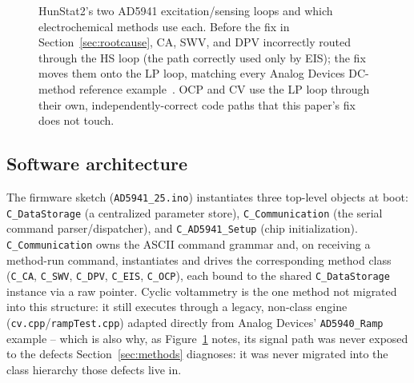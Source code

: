 \begin{figure}[h]
\centering
{}
\caption{HunStat2's two AD5941 excitation/sensing loops and which
electrochemical methods use each. Before the fix in
Section~\ref{sec:rootcause}, CA, SWV, and DPV incorrectly routed through
the HS loop (the path correctly used only by EIS); the fix moves them onto
the LP loop, matching every Analog Devices DC-method reference
example~\cite{ad5940_examples_github}. OCP and CV use the LP loop through
their own, independently-correct code paths that this paper's fix does not
touch.}
\label{fig:loop-diagram}
\end{figure}

\subsection{Software architecture}
\label{sec:swarch}
The firmware sketch (\texttt{AD5941\_25.ino}) instantiates three top-level
objects at boot: \texttt{C\_DataStorage} (a centralized parameter store),
\texttt{C\_Communication} (the serial command parser/dispatcher), and
\texttt{C\_AD5941\_Setup} (chip initialization). \texttt{C\_Communication}
owns the ASCII command grammar and, on receiving a method-run command,
instantiates and drives the corresponding method class (\texttt{C\_CA},
\texttt{C\_SWV}, \texttt{C\_DPV}, \texttt{C\_EIS}, \texttt{C\_OCP}), each
bound to the shared \texttt{C\_DataStorage} instance via a raw pointer.
Cyclic voltammetry is the one method not migrated into this structure: it
still executes through a legacy, non-class engine
(\texttt{cv.cpp}/\texttt{rampTest.cpp}) adapted directly from Analog
Devices' \texttt{AD5940\_Ramp} example -- which is also why, as
Figure~\ref{fig:loop-diagram} notes, its signal path was never exposed to
the defects Section~\ref{sec:methods} diagnoses: it was never migrated
into the class hierarchy those defects live in.

